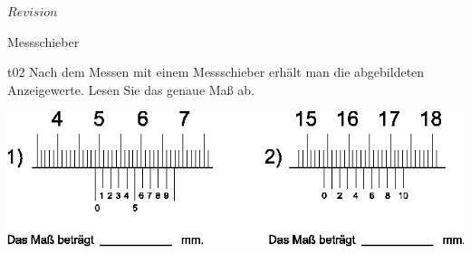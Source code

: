 \RCS $Revision$
\begin{aufgabe}[Technologie]{Messschieber}
   \begin{teilaufgabe}[ohnenummer]{t}{0}{2}
       Nach dem Messen mit einem Messschieber erhält man die abgebildeten
       Anzeigewerte. Lesen Sie das genaue Maß ab. \par
       \vspace{5mm} \par
       \includegraphics[width=155mm]{aufgabe-2} \par
   \end{teilaufgabe}
   \begin{loesung}
   \end{loesung}
\end{aufgabe}

